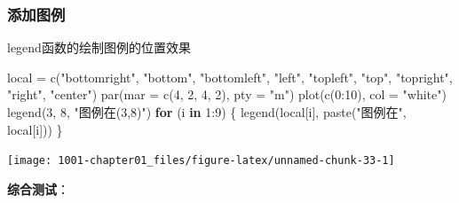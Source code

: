 \documentclass[
]{book}
\newenvironment{Shaded}{\begin{snugshade}}{\end{snugshade}}
\newcommand{\AttributeTok}[1]{\textcolor[rgb]{0.77,0.63,0.00}{#1}}
\newcommand{\ControlFlowTok}[1]{\textcolor[rgb]{0.13,0.29,0.53}{\textbf{#1}}}
\newcommand{\DecValTok}[1]{\textcolor[rgb]{0.00,0.00,0.81}{#1}}
\newcommand{\FunctionTok}[1]{\textcolor[rgb]{0.00,0.00,0.00}{#1}}
\newcommand{\NormalTok}[1]{#1}
\newcommand{\OtherTok}[1]{\textcolor[rgb]{0.56,0.35,0.01}{#1}}
\newcommand{\SpecialCharTok}[1]{\textcolor[rgb]{0.00,0.00,0.00}{#1}}
\newcommand{\StringTok}[1]{\textcolor[rgb]{0.31,0.60,0.02}{#1}}
\begin{document}
\hypertarget{ux6dfbux52a0ux56feux4f8b}{%
\subsubsection{添加图例}\label{ux6dfbux52a0ux56feux4f8b}}

legend函数的绘制图例的位置效果

\begin{Shaded}
\begin{Highlighting}[]
\NormalTok{local }\OtherTok{=} \FunctionTok{c}\NormalTok{(}\StringTok{"bottomright"}\NormalTok{, }\StringTok{"bottom"}\NormalTok{, }\StringTok{"bottomleft"}\NormalTok{, }\StringTok{"left"}\NormalTok{, }\StringTok{"topleft"}\NormalTok{, }\StringTok{"top"}\NormalTok{, }\StringTok{"topright"}\NormalTok{, }
    \StringTok{"right"}\NormalTok{, }\StringTok{"center"}\NormalTok{)}
\FunctionTok{par}\NormalTok{(}\AttributeTok{mar =} \FunctionTok{c}\NormalTok{(}\DecValTok{4}\NormalTok{, }\DecValTok{2}\NormalTok{, }\DecValTok{4}\NormalTok{, }\DecValTok{2}\NormalTok{), }\AttributeTok{pty =} \StringTok{"m"}\NormalTok{)}
\FunctionTok{plot}\NormalTok{(}\FunctionTok{c}\NormalTok{(}\DecValTok{0}\SpecialCharTok{:}\DecValTok{10}\NormalTok{), }\AttributeTok{col =} \StringTok{"white"}\NormalTok{)}
\FunctionTok{legend}\NormalTok{(}\DecValTok{3}\NormalTok{, }\DecValTok{8}\NormalTok{, }\StringTok{"图例在(3,8)"}\NormalTok{)}
\ControlFlowTok{for}\NormalTok{ (i }\ControlFlowTok{in} \DecValTok{1}\SpecialCharTok{:}\DecValTok{9}\NormalTok{) \{}
    \FunctionTok{legend}\NormalTok{(local[i], }\FunctionTok{paste}\NormalTok{(}\StringTok{"图例在"}\NormalTok{, local[i]))}
\NormalTok{\}}
\end{Highlighting}
\end{Shaded}

\begin{center}\texttt{[image: 1001-chapter01\_files/figure-latex/unnamed-chunk-33-1]} \end{center}

\textbf{综合测试}：
\end{document}
